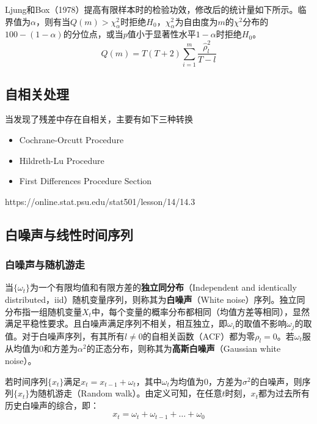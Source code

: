 \documentclass[11pt]{article}
\begin{document}
Ljung和Box（1978）提高有限样本时的检验功效，修改后的统计量如下所示。临界值为$\alpha$，则有当$Q(m)>\chi_{\alpha}^{2}$时拒绝$H_0$，$\chi_{\alpha}^{2}$为自由度为$m$的$\chi^{2}$分布的$100-(1-\alpha)$的分位点，或当$p$值小于显著性水平$1-\alpha$时拒绝$H_0$。
\begin{equation*}
    Q(m) = T(T+2) \sum_{i=1}^{m} \frac{\hat{\rho}_{l}^{2}}{T-l}
\end{equation*}

\subsection{自相关处理}

当发现了残差中存在自相关，主要有如下三种转换
\begin{itemize}
    \item Cochrane-Orcutt Procedure
    \item Hildreth-Lu Procedure
    \item First Differences Procedure Section
\end{itemize}

https://online.stat.psu.edu/stat501/lesson/14/14.3

\subsection{白噪声与线性时间序列}

\subsubsection{白噪声与随机游走}

当$\{\omega_t\}$为一个有限均值和有限方差的\textbf{独立同分布}（Independent and identically distributed，iid）随机变量序列，则称其为\textbf{白噪声}（White noise）序列。独立同分布指一组随机变量$X_t$中，每个变量的概率分布都相同（均值方差等相同），显然满足平稳性要求。且白噪声满足序列不相关，相互独立，即$\omega_i$的取值不影响$\omega_j$的取值。对于白噪声序列，有其所有$l \neq 0 $的自相关函数（ACF）都为零$\rho_l = 0$。若$\omega_t$服从均值为$0$和方差为$\alpha^{2}$的正态分布，则称其为\textbf{高斯白噪声}（Gaussian white noise）。

若时间序列$\{x_t\}$满足$x_t = x_{t-1} + \omega_t$，其中$\omega_t$为均值为$0$，方差为$\sigma^2$的白噪声，则序列$\{x_t\}$为随机游走（Random walk）。由定义可知，在任意$t$时刻，$x_t$都为过去所有历史白噪声的综合，即：
\begin{equation*}
    x_t = \omega_{t} + \omega_{t-1} + \dots + \omega_0
\end{equation*}
\end{document}
